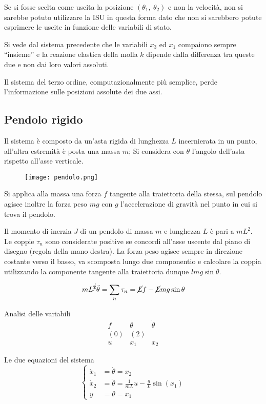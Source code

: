 Se si fosse scelta come uscita la posizione $(\theta_1,\ \theta_2)$ e non la
velocità, non si sarebbe potuto utilizzare la ISU in questa forma dato che non
si sarebbero potute esprimere le uscite in funzione delle variabili di stato.

Si vede dal sistema precedente che le variabili $x_3$ ed $x_1$ compaiono sempre
``insieme'' e la reazione elastica della molla $k$ dipende dalla differenza tra
queste due e non dai loro valori assoluti.

Il sistema del terzo ordine, computazionalmente più semplice, perde
l'informazione sulle posizioni assolute dei due assi.

\newpage
\subsection{Pendolo rigido}
Il sistema è composto da un'asta rigida di lunghezza $L$ incernierata in un
punto, all'altra estremità è posta una massa $m$;
Si considera con $\theta$ l'angolo dell'asta rispetto all'asse verticale.
\begin{figure}[h]
 \centering
 \texttt{[image: pendolo.png]}
 \label{Fig.:pendolo_semplice}
\end{figure}

Si applica alla massa una forza $f$ tangente alla traiettoria della stessa, sul
pendolo agisce inoltre la forza peso $mg$ con $g$ l'accelerazione di gravità
nel punto in cui si trova il pendolo.

Il momento di inerzia $J$ di un pendolo di massa $m$ e lunghezza $L$ è pari a
$mL^2$.
Le coppie $\tau_n$ sono considerate positive se concordi all'asse uscente dal
piano di disegno (regola della mano destra).
La forza peso agisce sempre in direzione costante verso il basso, va scomposta
lungo due componentio e calcolare la coppia utilizzando la componente tangente
alla traiettoria dunque $lmg\sin\theta$.

$$
mL^{\cancel{2}}\ddot\theta = \sum_n{\tau_n} = \cancel{L}f -
\cancel{L}mg\sin\theta
$$

Analisi delle variabili
$$\begin{matrix}
f & \theta & \dot\theta \\
(0) & (2)  \\
u & x_1 & x_2
\end{matrix}$$

Le due equazioni del sistema
$$\left\{\begin{aligned}
\dot x_1 &= \dot\theta = x_2\\
\dot x_2 &= \ddot\theta = \frac{1}{mL} u - \frac{g}{L} \sin(x_1) \\
y &= \theta = x_1
\end{aligned}\right.$$

